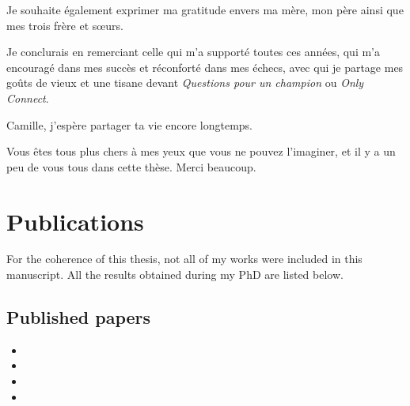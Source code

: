 \smallskip

Je souhaite également exprimer ma gratitude envers ma mère, mon père ainsi que mes trois frère et sœurs.

\smallskip
Je conclurais en remerciant celle qui m'a supporté toutes ces années, qui m'a encouragé dans mes succès et réconforté dans mes échecs, avec qui je partage mes goûts de vieux et une tisane devant \emph{Questions pour un champion} ou \emph{Only Connect}.

Camille, j'espère partager ta vie encore longtemps.

\bigskip
Vous êtes tous plus chers à mes yeux que vous ne pouvez l'imaginer, et il y a un peu de vous tous dans cette thèse. Merci beaucoup.


\endgroup


\chapter*{Publications} %



\noindent For the coherence of this thesis, not all of my works were included in this manuscript. All the results obtained during my PhD are listed below.

\section*{Published papers}

\begin{itemize}
\item {}

\item {}

\item {}

\item {}
\end{itemize}

